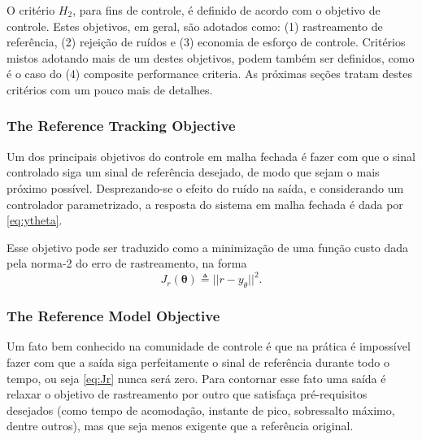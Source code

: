 O critério  $H_2$, para fins de controle, é definido de acordo com o objetivo de controle. Estes objetivos, em geral, são adotados como: (1) rastreamento de referência, (2) rejeição de ruídos e (3) economia de esforço de controle. Critérios mistos adotando mais de um destes objetivos, podem também ser definidos, como é o caso do (4) composite performance criteria. As próximas seções tratam destes critérios com um pouco mais de detalhes.


\subsubsection{The Reference Tracking Objective}%
\label{sub:the_reference_tracking_objective}
Um dos principais objetivos do controle em malha fechada é fazer com que o sinal controlado siga um sinal de referência desejado, de modo que sejam o mais próximo possível. Desprezando-se o efeito do ruído na saída, e considerando um controlador parametrizado, a resposta do sistema em malha fechada é dada por \eqref{eq:ytheta}.

Esse objetivo pode ser traduzido como a minimização de uma função custo dada pela norma-2 do erro de rastreamento, na forma
\begin{equation}
   J_r(\bm{\theta}) \triangleq || r - y_\theta ||^2 .
   \label{eq:Jr}
\end{equation}

\subsubsection{The Reference Model Objective}%
\label{sub:The Reference Model Objective}

Um fato bem conhecido na comunidade de controle é que na prática é impossível fazer com que a saída siga perfeitamente o sinal de referência durante todo o tempo, ou seja \eqref{eq:Jr} nunca será zero.
Para contornar esse fato uma saída é relaxar o objetivo de rastreamento por outro que satisfaça pré-requisitos desejados (como tempo de acomodação, instante de pico, sobressalto máximo, dentre outros), mas que seja menos exigente que a referência original.


